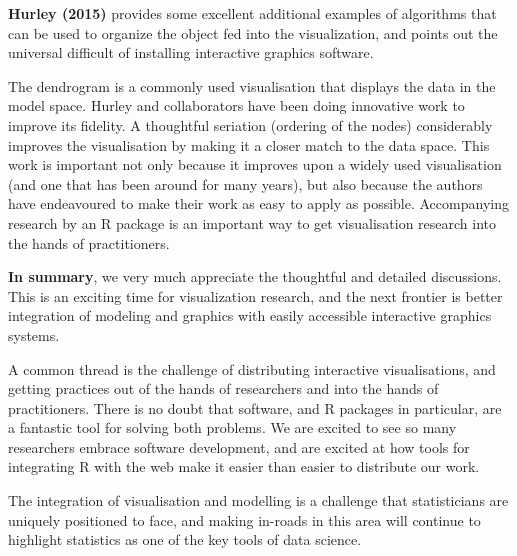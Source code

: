 \documentclass[preprint]{imsart}
\begin{document}

\textbf{Hurley (2015)} provides some excellent additional examples of algorithms that can be used to organize the object fed into the visualization, and points out the universal difficult of installing interactive graphics software.

The dendrogram is a commonly used visualisation that displays the data in the model space. Hurley and collaborators have been doing innovative work to improve its fidelity. A thoughtful seriation (ordering of the nodes) considerably improves the visualisation by making it a closer match to the data space. This work is important not only because it improves upon a widely used visualisation (and one that has been around for many years), but also because the authors have endeavoured to make their work as easy to apply as possible. Accompanying research by an R package is an important way to get visualisation research into the hands of practitioners.


\textbf{In summary}, we very much appreciate the thoughtful and detailed discussions. This is an exciting time for visualization research, and the next frontier is better integration of modeling and graphics with easily accessible interactive graphics systems.

A common thread is the challenge of distributing interactive visualisations, and getting practices out of the hands of researchers and into the hands of practitioners. There is no doubt that software, and R packages in particular, are a fantastic tool for solving both problems. We are excited to see so many researchers embrace software development, and are excited at how tools for integrating R with the web make it easier than easier to distribute our work.

The integration of visualisation and modelling is a challenge that statisticians are uniquely positioned to face, and making in-roads in this area will continue to highlight statistics as one of the key tools of data science.



\end{document}
